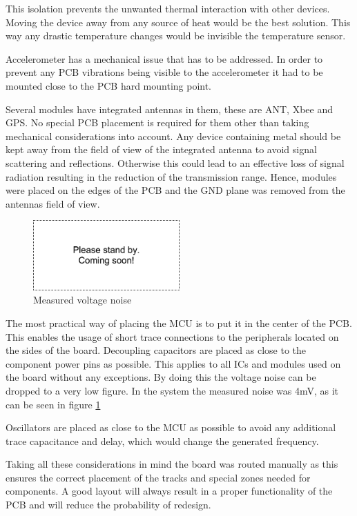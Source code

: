 This isolation prevents the unwanted thermal interaction with other devices. Moving the device away from any source of heat would be the best solution. This way any drastic temperature changes would be invisible the temperature sensor.

Accelerometer has a mechanical issue that has to be addressed. In order to prevent any PCB vibrations being visible to the accelerometer it had to be mounted close to the PCB hard mounting point. 

Several modules have integrated antennas in them, these are ANT, Xbee and GPS. No special PCB placement is required for them other than taking mechanical considerations into account. Any device containing metal should be kept away from the field of view of the integrated antenna to avoid signal scattering and reflections. Otherwise this could lead to an effective loss of signal radiation resulting in the reduction of the transmission range. Hence, modules were placed on the edges of the PCB and the GND plane was removed from the antennas field of view. 

\begin{figure}
\centering
\includegraphics[width=0.5\textwidth]{Images/dummy}
\caption{Measured voltage noise}
\label{fig:voltage_noise}
\end{figure}

The most practical way of placing the MCU is to put it in the center of the PCB. This enables the usage of short trace connections to the peripherals located on the sides of the board. Decoupling capacitors are placed as close to the component power pins as possible. This applies to all ICs and modules used on the board without any exceptions. By doing this the voltage noise can be dropped to a very low figure. In the system the measured noise was 4mV, as it can be seen in figure \ref{fig:voltage_noise}

Oscillators are placed as close to the MCU as possible to avoid any additional trace capacitance and delay, which would change the generated frequency. 

Taking all these considerations in mind the board was routed manually as this ensures the correct placement of the tracks and special zones needed for components. A good layout will always result in a proper functionality of the PCB and will reduce the probability of redesign.


